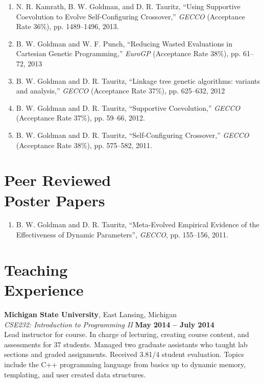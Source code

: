 \documentclass[margin,line]{resume}
\begin{document}
\begin{resume}
\begin{enumerate}
    \item
    N. R. Kamrath, B. W. Goldman, and D. R. Tauritz,
    ``Using Supportive Coevolution to Evolve Self-Configuring Crossover,''
    \textsl{GECCO} (Acceptance Rate 36\%), pp. 1489--1496, 2013.

    \item
    B. W. Goldman and W. F. Punch,
    ``Reducing Wasted Evaluations in  Cartesian Genetic Programming,''
    \textsl{EuroGP} (Acceptance Rate 38\%), pp. 61--72, 2013

    \item
    B. W. Goldman and D. R. Tauritz,
    ``Linkage tree genetic algorithms: variants and analysis,''
    \textsl{GECCO} (Acceptance Rate 37\%), pp. 625--632, 2012

    \item
    B. W. Goldman and D. R. Tauritz,
    ``Supportive Coevolution,''
    \textsl{GECCO} (Acceptance Rate 37\%), pp. 59--66, 2012.

    \item
    B. W. Goldman and D. R. Tauritz,
    ``Self-Configuring Crossover,''
    \textsl{GECCO} (Acceptance Rate 38\%), pp. 575--582, 2011.
    \end{enumerate}

    \pagebreak

    \section{\mysidestyle Peer Reviewed\\Poster Papers}
    \begin{enumerate}
    \item
    B. W. Goldman and D. R. Tauritz,
    ``Meta-Evolved Empirical Evidence of the Effectiveness of Dynamic Parameters'',
    \textsl{GECCO}, pp. 155--156, 2011.
    \end{enumerate}
    
    \section{\mysidestyle Teaching\\Experience}
    \textbf{Michigan State University}, East Lansing, Michigan \vspace{2mm}\\\vspace{1mm}%
    \textsl{CSE232: Introduction to Programming II} \hfill \textbf{May 2014 -- July 2014}\\
    Lead instructor for course. In charge of lecturing, creating course content, and assessments
    for 37 students. Managed two graduate assistants who taught lab sections and graded assignments.
    Received 3.81/4 student evaluation.
    Topics include the C++ programming language from basics up to dynamic memory, templating, and user created data structures.


\end{resume}
\end{document}
